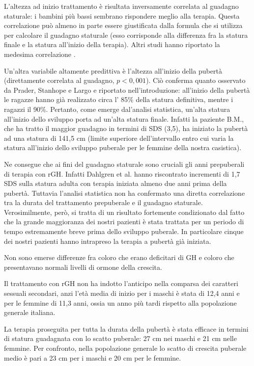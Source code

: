 L'altezza ad inizio trattamento è risultata inversamente correlata al guadagno staturale: i bambini più bassi sembrano rispondere meglio alla terapia. Questa correlazione può almeno in parte essere giustificata dalla formula che si utilizza per calcolare il guadagno staturale (esso corrisponde alla differenza fra la statura finale e la statura all'inizio della terapia). Altri studi hanno riportato la medesima correlazione\cite{de2005growth} \cite{de2000growth}.

Un'altra variabile altamente predittiva è l'altezza all'inizio della pubertà (direttamente correlata al guadagno, $p < 0,001$). Ciò conferma quanto osservato da Prader, Stanhope e Largo  e riportato nell'introduzione: 
 all'inizio della pubertà le ragazze hanno già realizzato circa l' 85\% della statura definitiva, mentre i ragazzi il 90\%. Pertanto, come emerge dal'analisi statistica, un'alta statura all'inizio dello sviluppo porta ad un'alta statura finale. Infatti la paziente B.M., che ha tratto il maggior guadagno in termini di SDS (3,5), ha iniziato la pubertà ad una statura di 141,5 cm (limite superiore dell'intervallo entro cui varia la statura all'inizio dello sviluppo puberale per le femmine della nostra casistica). 

Ne consegue che ai fini del guadagno staturale sono cruciali gli anni prepuberali di terapia con rGH. Infatti Dahlgren et al. hanno riscontrato incrementi di 1,7 SDS sulla statura adulta con terapia iniziata almeno due anni prima della pubertà\cite{dahlgren2005final}. Tuttavia l'analisi statistica non ha confermato una diretta correlazione tra la durata del trattamento prepuberale e il guadagno staturale. Verosimilmente, però, si tratta di un risultato fortemente condizionato dal fatto che la grande maggioranza dei nostri pazienti è stata trattata per un periodo di tempo estremamente breve prima dello sviluppo puberale. In particolare cinque dei nostri pazienti hanno intrapreso la terapia a pubertà già iniziata.

Non sono emerse differenze fra coloro che erano deficitari di GH  e coloro che presentavano normali livelli di ormone della crescita.

Il trattamento con rGH non ha indotto l'anticipo nella comparsa dei caratteri sessuali secondari, anzi l'età media di inizio per i maschi è stata di 12,4 anni e per le femmine di 11,3 anni, ossia un anno più tardi rispetto alla popolazione generale italiana\cite{benso1989distribution}.

La terapia proseguita per tutta la durata della pubertà è stata efficace in termini di statura guadagnata con lo scatto puberale: 27 cm nei maschi e 21 cm nelle femmine. Per confronto, nella popolazione generale lo scatto di crescita puberale medio è pari a 23 cm per i maschi e 20 cm per le femmine\cite{tanner1990foetus}. 

